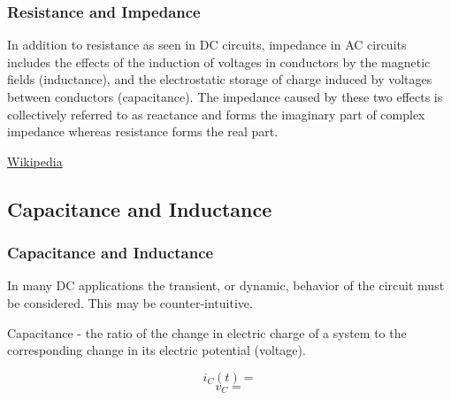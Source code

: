 \documentclass[fleqn]{beamer} %
\newcommand{\sectionIsubsectionIItitle}{Resistance and Impedance}
\newcommand{\sectionIsubsectionIIItitle}{Capacitance and Inductance}
\begin{document}
			\begin{frame}
				\frametitle{\sectionIsubsectionIItitle}

					In addition to {\PR resistance} as seen in DC circuits, {\PN impedance} in AC circuits includes the effects of the induction of voltages in conductors by the magnetic fields (inductance), and the electrostatic storage of charge induced by voltages between conductors (capacitance). The impedance caused by these two effects is collectively referred to as reactance and forms the imaginary part of complex impedance whereas resistance forms the real part. 

{\tiny \href{https://en.wikipedia.org/wiki/Electrical_impedance}{Wikipedia}}

	

			\end{frame}


			\begin{frame}

						\bigskip  
			


			\end{frame}

			\begin{frame}




		
			\end{frame}





		\subsection{\sectionIsubsectionIIItitle}\label{sectionIsubsectionIII}
			\begin{frame} 
				\frametitle{\sectionIsubsectionIIItitle}

				\bigskip

					In many DC applications the transient, or dynamic, behavior of the circuit must be considered. This may be counter-intuitive. \vspc
	
		{\PR Capacitance} - the ratio of the change in electric charge of a system to the corresponding change in its electric potential (voltage). \vspc

	\begin{fleqn}
		\[i_C(t)=\] \vspace{2mm}
		\[v_C=\]
	\end{fleqn}







			\end{frame}	
\end{document}
